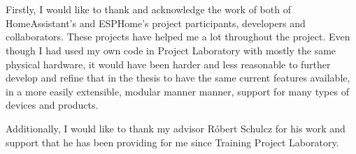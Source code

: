 \chapter*{\koszonetnyilvanitas}


Firstly, I would like to thank and acknowledge the work of both of HomeAssistant's and ESPHome's project participants, developers and collaborators. These projects have helped me a lot throughout the project. Even though I had used my own code in Project Laboratory with mostly the same physical hardware, it would have been harder and less reasonable to further develop and refine that in the thesis to have the same current features available, in a more easily extensible, modular manner manner, support for many types of devices and products. \break

Additionally, I would like to thank my advisor Róbert Schulcz for his work and support that he has been providing for me since Training Project Laboratory.
